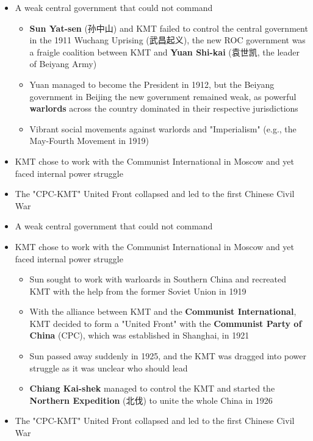 \documentclass[
  10pt,
  ignorenonframetext,
]{beamer}
\begin{document}
\begin{frame}
\begin{itemize}
\small
  \item A weak central government that could not command
  \vspace{0.1cm}
  \begin{itemize}
    \item \textbf{Sun Yat-sen} (孙中山) and KMT failed to control the central government in the 1911 Wuchang Uprising (武昌起义), the new ROC government was a fraigle coalition between KMT and \textbf{Yuan Shi-kai} (袁世凯, the leader of Beiyang Army)
    \item Yuan managed to become the President in 1912, but the Beiyang government in Beijing the new government remained weak, as powerful \textbf{warlords} across the country dominated in their respective jurisdictions
    \item Vibrant social movements against warlords and "Imperialism" (e.g., the May-Fourth Movement in 1919)
  \end{itemize}
  \vspace{0.4cm}
  \item KMT chose to work with the Communist International in Moscow and yet faced internal power struggle
  \vspace{0.4cm}
  \item The "CPC-KMT" United Front collapsed and led to the first Chinese Civil War
\end{itemize}
\end{frame}

\begin{frame}
\begin{itemize}
\small
  \item A weak central government that could not command
  \vspace{0.4cm}
  \item KMT chose to work with the Communist International in Moscow and yet faced internal power struggle
  \vspace{0.1cm}
  \begin{itemize}
    \item Sun sought to work with warloards in Southern China and recreated KMT with the help from the former Soviet Union in 1919
    \item With the alliance between KMT and the \textbf{Communist International}, KMT decided to form a "United Front" with the \textbf{Communist Party of China} (CPC), which was established in Shanghai, in 1921
    \item Sun passed away suddenly in 1925, and the KMT was dragged into power struggle as it was unclear who should lead
    \item \textbf{Chiang Kai-shek} managed to control the KMT and started the \textbf{Northern Expedition} (北伐) to unite the whole China in 1926
  \end{itemize}
  \vspace{0.4cm}
  \item The "CPC-KMT" United Front collapsed and led to the first Chinese Civil War
\end{itemize}
\end{frame}
\end{document}
